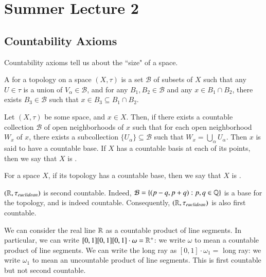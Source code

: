 \documentclass[12pt, a4paper, oneside, openright, titlepage]{book}
\begin{document}

\section{Summer Lecture 2} %

\subsection{Countability Axioms}

\begin{rmk}
    Countability axioms tell us about the ``size" of a space.
\end{rmk}

\begin{rec}
    A  for a topology on a space $(X,\tau)$ is a set $\mathcal{B}$ of subsets of $X$ such that any $U \in \tau$ is a union of $V_{\alpha} \in \mathcal{B}$, and for any $B_1,B_2 \in \mathcal{B}$ and any $x \in B_1\cap B_2$, there exists $B_3 \in \mathcal{B}$ such that $x \in B_3 \subseteq B_1 \cap B_2$.
\end{rec}


\begin{defn}
    Let $(X,\tau)$ be some space, and $x \in X$. Then, if there exists a countable collection $\mathcal{B}$ of open neighborhoods of $x$ such that for each open neighborhood $W_x$ of $x$, there exists a subcollection $\{U_{\alpha}\} \subseteq \mathcal{B}$ such that $W_x = \bigcup_{\alpha}U_{\alpha}$. Then $x$ is said to have a countable base. If $X$ has a countable basis at each of its points, then we say that $X$ is .
\end{defn}


\begin{defn}
    For a space $X$, if its topology has a countable base, then we say that $X$ is .
\end{defn}


\begin{eg}
    $(\mathbb R,\tau_{euclidean})$ is second countable. Indeed, $\mathcal{B} = \{(p-q,p+q):p,q \in \mathbb Q\}$ is a base for the topology, and is indeed countable. Consequently, $(\mathbb R,\tau_{euclidean})$ is also first countable.
\end{eg}

\begin{eg}
    We can consider the real line $\mathbb R$ as a countable product of line segments. In particular, we can write $[0,1][0,1][0,1]\cdot \omega =\mathbb R^+$: we write $\omega$ to mean a countable product of line segments. We can write the long ray as $[0,1]\cdot \omega_1 = $ long ray: we write $\omega_1$ to mean an uncountable product of line segments. This is first countable but not second countable.
\end{eg}
\end{document}
